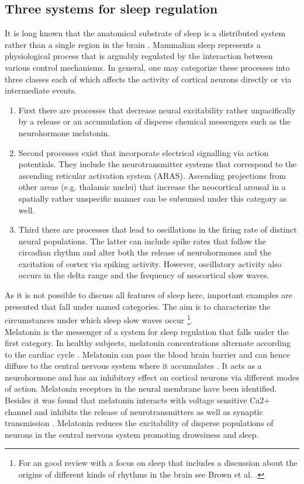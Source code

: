 \subsection{Three systems for sleep regulation}
It is long known that the anatomical substrate of sleep is a distributed system rather than a single region in the brain \parencite{akert1965anatomical}. Mammalian sleep represents a physiological process that is arguably regulated by the interaction between various control mechanisms. In general, one may categorize these processes into three classes each of which affects the activity of cortical neurons directly or via intermediate events.
\begin{enumerate}[label={(\arabic*)}]
    \item First there are processes that decrease neural excitability rather unpacifically by a release or an accumulation of disperse chemical messengers such as the neurohormone melatonin.
    \item Second processes exist that incorporate electrical signalling via action potentials. They include the neurotransmitter systems that correspond to the ascending reticular activation system (ARAS). Ascending projections from other areas (e.g. thalamic nuclei) that increase the neocortical arousal in a spatially rather unspecific manner can be subsumed under this category as well.
    \item Third there are processes that lead to oscillations in the firing rate of distinct neural populations. The latter can include spike rates that follow the circadian rhythm and alter both the release of neurohormones and the excitation of cortex via spiking activity. However, oscillatory activity also occurs in the delta range and the frequency of neocortical slow waves.
\end{enumerate}
As it is not possible to discuss all features of sleep here, important examples are presented that fall under named categories. The aim is to characterize the circumstances under which sleep slow waves occur \footnote{For an good review with a focus on sleep that includes a discussion about the origins of different kinds of rhythms in the brain see Brown et al. \parencite*{brown2012control}.}.\\
Melatonin is the messenger of a system for sleep regulation that falls under the first category. In healthy subjects, melatonin concentrations alternate according to the cardiac cycle \parencite{montagna2005fatal}. Melatonin can pass the blood brain barrier and can hence diffuse to the central nervous system where it accumulates \parencite{aulinas2019physiology}. It acts as a neurohormone and has an inhibitory effect on cortical neurons via different modes of action. Melatonin receptors in the neural membrane have been identified. Besides it was found that melatonin interacts with voltage sensitive Ca2+ channel and inhibits the release of neurotransmitters as well as synaptic transmission \parencite{choi2014melatonin}. Melatonin reduces the excitability of disperse populations of neurons in the central nervous system promoting drowsiness and sleep. \\
